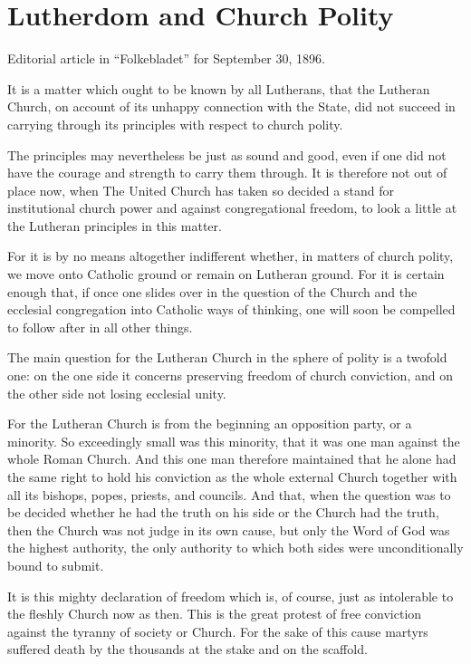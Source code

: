 
\section{Lutherdom and Church Polity}

Editorial article in “Folkebladet” for September 30, 1896.

It is a matter which ought to be known by all Lutherans, that the Lutheran Church, on account of its unhappy connection with the State, did not succeed in carrying through its principles with respect to church polity.

The principles may nevertheless be just as sound and good, even if one did not have the courage and strength to carry them through. It is therefore not out of place now, when The United Church has taken so decided a stand for institutional church power and against congregational freedom, to look a little at the Lutheran principles in this matter.

For it is by no means altogether indifferent whether, in matters of church polity, we move onto Catholic ground or remain on Lutheran ground. For it is certain enough that, if once one slides over in the question of the Church and the ecclesial congregation into Catholic ways of thinking, one will soon be compelled to follow after in all other things.

The main question for the Lutheran Church in the sphere of polity is a twofold one: on the one side it concerns preserving freedom of church conviction, and on the other side not losing ecclesial unity.

For the Lutheran Church is from the beginning an opposition party, or a minority. So exceedingly small was this minority, that it was one man against the whole Roman Church. And this one man therefore maintained that he alone had the same right to hold his conviction as the whole external Church together with all its bishops, popes, priests, and councils. And that, when the question was to be decided whether he had the truth on his side or the Church had the truth, then the Church was not judge in its own cause, but only the Word of God was the highest authority, the only authority to which both sides were unconditionally bound to submit.

It is this mighty declaration of freedom which is, of course, just as intolerable to the fleshly Church now as then. This is the great protest of free conviction against the tyranny of society or Church. For the sake of this cause martyrs suffered death by the thousands at the stake and on the scaffold.

